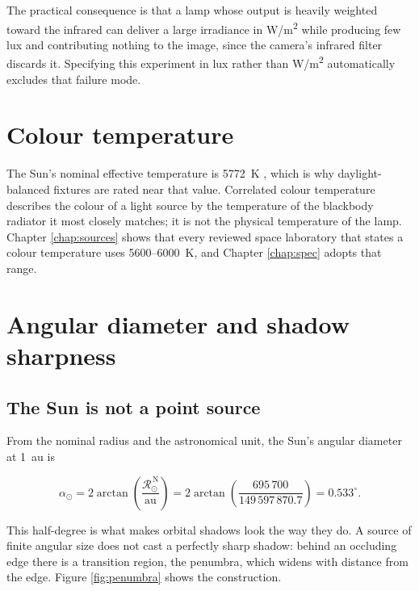 The practical consequence is that a lamp whose output is heavily weighted toward the infrared can deliver a large irradiance in W/m\textsuperscript{2} while producing few lux and contributing nothing to the image, since the camera's infrared filter discards it. Specifying this experiment in lux rather than W/m\textsuperscript{2} automatically excludes that failure mode.

\section{Colour temperature}
\label{sec:colour}

The Sun's nominal effective temperature is 5772~K \cite{prsa2016iau}, which is why daylight-balanced fixtures are rated near that value. Correlated colour temperature describes the colour of a light source by the temperature of the blackbody radiator it most closely matches; it is not the physical temperature of the lamp. Chapter \ref{chap:sources} shows that every reviewed space laboratory that states a colour temperature uses 5600--6000~K, and Chapter \ref{chap:spec} adopts that range.

\section{Angular diameter and shadow sharpness}
\label{sec:angular}

\subsection{The Sun is not a point source}

From the nominal radius and the astronomical unit, the Sun's angular diameter at 1~au is

\begin{equation}
\alpha_\odot = 2\arctan\!\left(\frac{\mathcal{R}^{\,\mathrm{N}}_{\odot}}{\mathrm{au}}\right)
= 2\arctan\!\left(\frac{695\,700}{149\,597\,870.7}\right) = 0.533^\circ .
\label{eq:angular-diameter}
\end{equation}

This half-degree is what makes orbital shadows look the way they do. A source of finite angular size does not cast a perfectly sharp shadow: behind an occluding edge there is a transition region, the penumbra, which widens with distance from the edge. Figure \ref{fig:penumbra} shows the construction.

